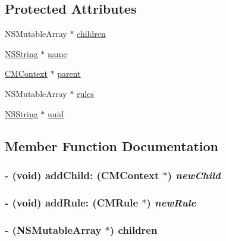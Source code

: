\subsection*{Protected Attributes}
\begin{CompactItemize}
\item 
NSMutableArray $\ast$ \hyperlink{interface_c_m_context_0f56af66d0edbc10d1ab24342416b8f0}{children}
\item 
\hyperlink{class_n_s_string}{NSString} $\ast$ \hyperlink{interface_c_m_context_46c82635439f9fa7e72ea26658c75e9b}{name}
\item 
\hyperlink{interface_c_m_context}{CMContext} $\ast$ \hyperlink{interface_c_m_context_c34d30931a639b237c9249b65641180a}{parent}
\item 
NSMutableArray $\ast$ \hyperlink{interface_c_m_context_9ce88fc0f29f5c91c2b88343332d179c}{rules}
\item 
\hyperlink{class_n_s_string}{NSString} $\ast$ \hyperlink{interface_c_m_context_35d03d537cce465cc6ec2e40279e9355}{uuid}
\end{CompactItemize}


\subsection{Member Function Documentation}
\hypertarget{interface_c_m_context_2c1b7c478eb09a0fe18237991416462f}{
\subsubsection[addChild:]{\setlength{\rightskip}{0pt plus 5cm}- (void) addChild: ({\bf CMContext} $\ast$) {\em newChild}}}
\label{interface_c_m_context_2c1b7c478eb09a0fe18237991416462f}


\hypertarget{interface_c_m_context_836a1f40530fd5c09eb81a15ea61be43}{
\subsubsection[addRule:]{\setlength{\rightskip}{0pt plus 5cm}- (void) addRule: ({\bf CMRule} $\ast$) {\em newRule}}}
\label{interface_c_m_context_836a1f40530fd5c09eb81a15ea61be43}


\hypertarget{interface_c_m_context_2828bdd4fcd99c44429a54ed10d86dbb}{
\subsubsection[children]{\setlength{\rightskip}{0pt plus 5cm}- (NSMutableArray $\ast$) {\bf children} }}
\label{interface_c_m_context_2828bdd4fcd99c44429a54ed10d86dbb}


